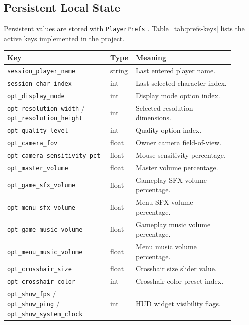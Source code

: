 \subsection*{Persistent Local State}
Persistent values are stored with \texttt{PlayerPrefs} \cite{unity_playerprefs_docs}. Table~\ref{tab:prefs-keys} lists the active keys implemented in the project.
\begin{table}[H]
\centering
\caption{Persistent Preference Keys}
\label{tab:prefs-keys}
\begin{longtable}{|>{\centering\arraybackslash}m{0.4\linewidth}|>{\centering\arraybackslash}m{0.08\linewidth}|>{\centering\arraybackslash}m{0.42\linewidth}|}
\hline
\hline
\textbf{Key} & \textbf{Type} & \textbf{Meaning} \\
\hline
\texttt{session\_player\_name} & string & Last entered player name. \\
\hline
\texttt{session\_char\_index} & int & Last selected character index. \\
\hline
\texttt{opt\_display\_mode} & int & Display mode option index. \\
\hline
\texttt{opt\_resolution\_width} / \texttt{opt\_resolution\_height} & int & Selected resolution dimensions. \\
\hline
\texttt{opt\_quality\_level} & int & Quality option index. \\
\hline
\texttt{opt\_camera\_fov} & float & Owner camera field-of-view. \\
\hline
\texttt{opt\_camera\_sensitivity\_pct} & float & Mouse sensitivity percentage. \\
\hline
\texttt{opt\_master\_volume} & float & Master volume percentage. \\
\hline
\texttt{opt\_game\_sfx\_volume} & float & Gameplay SFX volume percentage. \\
\hline
\texttt{opt\_menu\_sfx\_volume} & float & Menu SFX volume percentage. \\
\hline
\texttt{opt\_game\_music\_volume} & float & Gameplay music volume percentage. \\
\hline
\texttt{opt\_menu\_music\_volume} & float & Menu music volume percentage. \\
\hline
\texttt{opt\_crosshair\_size} & float & Crosshair size slider value. \\
\hline
\texttt{opt\_crosshair\_color} & int & Crosshair color preset index. \\
\hline
\texttt{opt\_show\_fps} / \texttt{opt\_show\_ping} / \texttt{opt\_show\_system\_clock} & int & HUD widget visibility flags. \\
\hline
\end{longtable}
\addtocounter{table}{-1}
\end{table}

